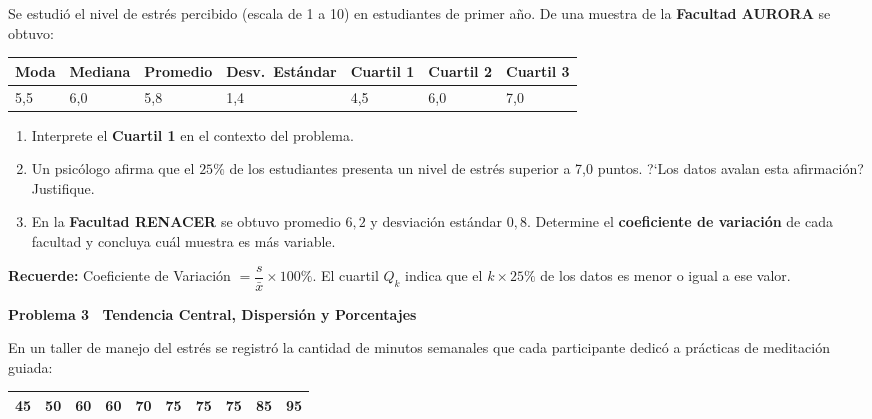 \documentclass[10pt,letterpaper]{article}
\newcommand{\seccion}[1]{%
  \vspace{2pt}%
  \begin{tcolorbox}[enhanced,colback=white,colframe=black,arc=0pt,boxrule=0pt,
    leftrule=2pt,left=6pt,right=6pt,top=1pt,bottom=1pt]
    {\normalsize\bfseries\sffamily #1}
  \end{tcolorbox}%
  \vspace{1pt}%
}
\newcommand{\reglacaja}[1]{%
  \begin{tcolorbox}[enhanced,colback=white,colframe=black,arc=0pt,boxrule=0.5pt,
    left=6pt,right=6pt,top=2pt,bottom=2pt,breakable]
  \small\sffamily #1
  \end{tcolorbox}%
}
\begin{document}
\noindent\sffamily\small Se estudi\'o el nivel de estr\'es percibido (escala de 1 a 10) en estudiantes de primer a\~no. De una muestra de la \textbf{Facultad AURORA} se obtuvo:

\vspace{4pt}
\begin{center}
\small\sffamily
\begin{tabular}{|l|l|l|l|l|l|l|}
\hline
\textbf{Moda} & \textbf{Mediana} & \textbf{Promedio} & \textbf{Desv.\ Est\'andar} & \textbf{Cuartil 1} & \textbf{Cuartil 2} & \textbf{Cuartil 3} \\
\hline
5{,}5 & 6{,}0 & 5{,}8 & 1{,}4 & 4{,}5 & 6{,}0 & 7{,}0 \\
\hline
\end{tabular}
\end{center}
\vspace{4pt}

\begin{enumerate}[leftmargin=1.2cm, label=\textbf{\alph*)}, itemsep=2pt, topsep=2pt]
  \item Interprete el \textbf{Cuartil 1} en el contexto del problema.
  \item Un psic\'ologo afirma que el $25\%$ de los estudiantes presenta un nivel de estr\'es superior a 7{,}0 puntos. ?`Los datos avalan esta afirmaci\'on? Justifique.
  \item En la \textbf{Facultad RENACER} se obtuvo promedio $6{,}2$ y desviaci\'on est\'andar $0{,}8$. Determine el \textbf{coeficiente de variaci\'on} de cada facultad y concluya cu\'al muestra es m\'as variable.
\end{enumerate}

\reglacaja{%
\textbf{Recuerde:} Coeficiente de Variaci\'on $= \dfrac{s}{\bar{x}} \times 100\%$.\quad
El cuartil $Q_k$ indica que el $k\times25\%$ de los datos es menor o igual a ese valor.%
}

\seccion{Problema 3 \textendash\ Tendencia Central, Dispersi\'on y Porcentajes}

\noindent\sffamily\small En un taller de manejo del estr\'es se registr\'o la cantidad de minutos semanales que cada participante dedic\'o a pr\'acticas de meditaci\'on guiada:

\vspace{4pt}
\begin{center}
\small\sffamily
\begin{tabular}{|c|c|c|c|c|c|c|c|c|c|}
\hline
45 & 50 & 60 & 60 & 70 & 75 & 75 & 75 & 85 & 95 \\
\hline
\end{tabular}
\end{center}
\vspace{4pt}
\end{document}
